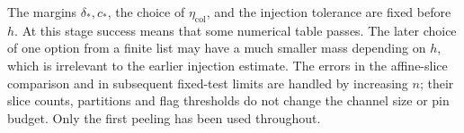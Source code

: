 \begin{remark}
\label{rem:preparation-accuracies}
The margins \(\delta_*,c_*\), the choice of
\(\eta_{\mathrm{col}}\), and the injection tolerance are fixed
before \(h\).  At this stage success means that some numerical
table passes.  The later choice of one option from a finite list
may have a much smaller mass depending on \(h\), which is
irrelevant to the earlier injection estimate.  The errors in the
affine-slice comparison and in subsequent fixed-test limits are
handled by increasing \(n\); their slice counts, partitions and
flag thresholds do not change the channel size or pin budget.
Only the first peeling has been used throughout.
\end{remark}
